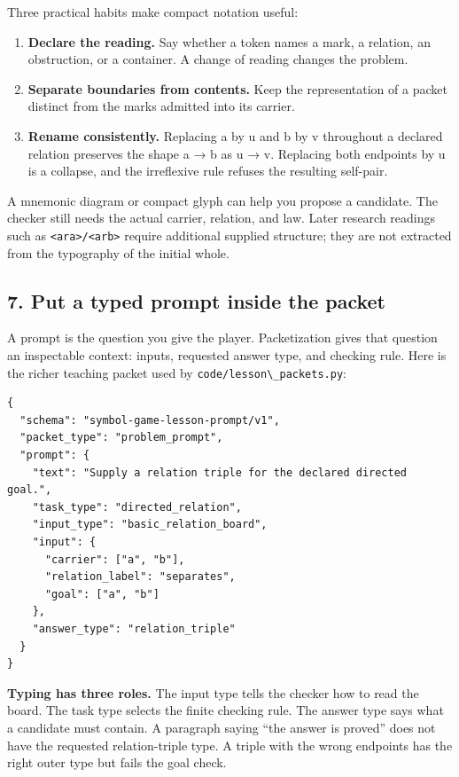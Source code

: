 \documentclass[
  11pt,
]{article}
\newcommand{\passthrough}[1]{#1}
\providecommand{\tightlist}{%
  \setlength{\itemsep}{0pt}\setlength{\parskip}{0pt}}
\begin{document}
Three practical habits make compact notation useful:

\begin{enumerate}
\def\labelenumi{\arabic{enumi}.}
\tightlist
\item
  \textbf{Declare the reading.} Say whether a token names a mark, a
  relation, an obstruction, or a container. A change of reading changes
  the problem.
\item
  \textbf{Separate boundaries from contents.} Keep the representation of
  a packet distinct from the marks admitted into its carrier.
\item
  \textbf{Rename consistently.} Replacing a by u and b by v throughout a
  declared relation preserves the shape a → b as u → v. Replacing both
  endpoints by u is a collapse, and the irreflexive rule refuses the
  resulting self-pair.
\end{enumerate}

A mnemonic diagram or compact glyph can help you propose a candidate.
The checker still needs the actual carrier, relation, and law. Later
research readings such as \passthrough{\lstinline!<ara>/<arb>!} require
additional supplied structure; they are not extracted from the
typography of the initial whole.

\subsection{7. Put a typed prompt inside the
packet}\label{put-a-typed-prompt-inside-the-packet}

A prompt is the question you give the player. Packetization gives that
question an inspectable context: inputs, requested answer type, and
checking rule. Here is the richer teaching packet used by
\passthrough{\lstinline!code/lesson\_packets.py!}:

\begin{lstlisting}
{
  "schema": "symbol-game-lesson-prompt/v1",
  "packet_type": "problem_prompt",
  "prompt": {
    "text": "Supply a relation triple for the declared directed goal.",
    "task_type": "directed_relation",
    "input_type": "basic_relation_board",
    "input": {
      "carrier": ["a", "b"],
      "relation_label": "separates",
      "goal": ["a", "b"]
    },
    "answer_type": "relation_triple"
  }
}
\end{lstlisting}

\textbf{Typing has three roles.} The input type tells the checker how to
read the board. The task type selects the finite checking rule. The
answer type says what a candidate must contain. A paragraph saying ``the
answer is proved'' does not have the requested relation-triple type. A
triple with the wrong endpoints has the right outer type but fails the
goal check.
\end{document}
